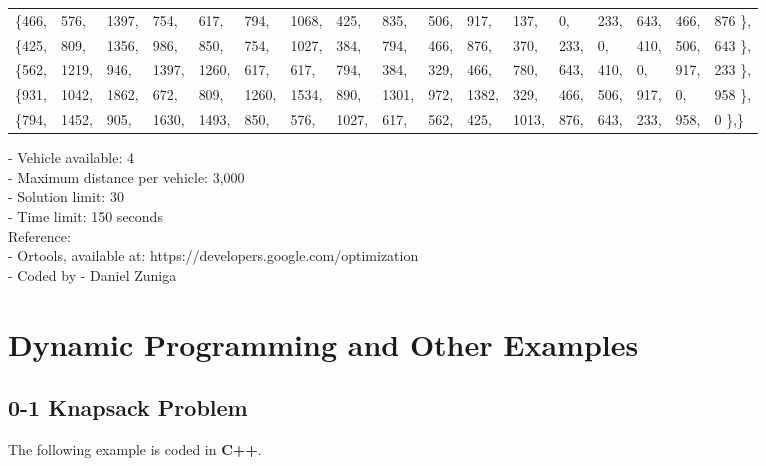\documentclass[10pt,bezier]{article}
\begin{document}
\begin{table}[!htbp]
{\begin{tabular}{ l l l l l l l l l l l l l l l l l}
            \{466,&   576,    &1397,   &754,    &617,    &794,    &1068,   &425,    &835,    &506,    &917,    &137,    &0,      &233,    &643,    &466,    &876 \}, \\
            \{425,&   809,    &1356,   &986,    &850,    &754,    &1027,   &384,    &794,    &466,    &876,    &370,    &233,    &0,      &410,    &506,    &643 \}, \\
            \{562,&   1219,   &946,    &1397,   &1260,   &617,    &617,    &794,    &384,    &329,    &466,    &780,    &643,    &410,    &0,      &917,    &233 \}, \\
            \{931,&   1042,   &1862,   &672,    &809,    &1260,   &1534,   &890,    &1301,   &972,    &1382,   &329,    &466,    &506,    &917,    &0,      &958 \}, \\
            \{794,&   1452,   &905,    &1630,   &1493,   &850,    &576,    &1027,   &617,    &562,    &425,    &1013,   &876,    &643,    &233,    &958,    &0   \},\}\\ 						
    \end{tabular}
    }			
\end{table}	

\noindent - Vehicle available: 4 \\
- Maximum distance per vehicle: 3,000 \\
- Solution limit: 30 \\
- Time limit: 150 seconds\\

\noindent Reference:\\
- Ortools, available at: {\color{blue}https://developers.google.com/optimization}\\
- Coded by - Daniel Zuniga

\newpage
\section{Dynamic Programming and Other Examples}\label{section7}

\subsection{0-1 Knapsack Problem}\label{Section7.1}
The following example is coded in {\color{blue}\textbf{C++}}.\\
\end{document}
